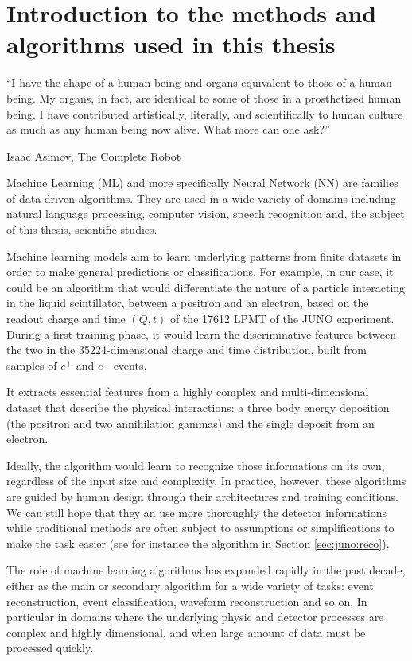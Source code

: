 \documentclass[../main.tex]{subfiles}
\begin{document}
\chapter{Introduction to the methods and algorithms used in this thesis}
\label{sec:ml}

\epigraph{``I have the shape of a human being and organs equivalent to those of a human being. My organs, in fact, are identical to some of those in a prosthetized human being. I have contributed artistically, literally, and scientifically to human culture as much as any human being now alive. What more can one ask?''}{Isaac Asimov, The Complete Robot}

\minitoc

Machine Learning (ML) and more specifically Neural Network (NN) are families of data-driven algorithms. They are used in a wide variety of domains including natural language processing, computer vision, speech recognition and, the subject of this thesis, scientific studies.

Machine learning models aim to learn underlying patterns from finite datasets in order to make general predictions or classifications.
For example, in our case, it could be an algorithm that would differentiate the nature of a particle interacting in the liquid scintillator, between a positron and an electron, based on the readout charge and time $(Q, t)$ of the 17612 LPMT of the JUNO experiment. During a first training phase, it would learn the discriminative features between the two in the 35224-dimensional charge and time distribution, built from samples of $e^+$ and $e^-$ events.

It extracts essential features from a highly complex and multi-dimensional dataset that describe the physical interactions: a three body energy deposition (the positron and two annihilation gammas) and the single deposit from an electron.

Ideally, the algorithm would learn to recognize those informations on its own, regardless of the input size and complexity. In practice, however, these algorithms are guided by human design through their architectures and training conditions. We can still hope that they an use more thoroughly the detector informations while traditional methods are often subject to assumptions or simplifications to make the task easier (see for instance the algorithm in Section \ref{sec:juno:reco}).

The role of machine learning algorithms has expanded rapidly in the past decade, either as the main or secondary algorithm for a wide variety of tasks: event reconstruction, event classification, waveform reconstruction and so on. In particular in domains where the underlying physic and detector processes are complex and highly dimensional, and when large amount of data must be processed quickly.
\end{document}
